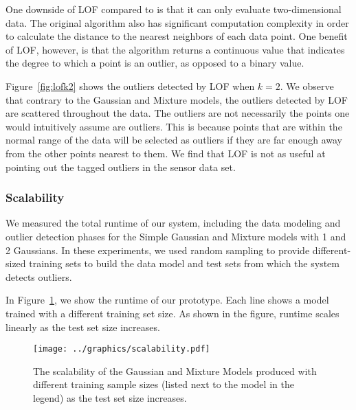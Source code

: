 One downside of LOF compared to \dBoost is that it can only evaluate two-dimensional data.
The original algorithm also has significant computation complexity in order to calculate the distance to the nearest neighbors of each data point.
One benefit of LOF, however, is that the algorithm returns a continuous value that indicates the degree to which a point is an outlier, as opposed to a binary value.

Figure~\ref{fig:lofk2} shows the outliers detected by LOF when $k=2$.
We observe that contrary to the Gaussian and Mixture models, the outliers detected by LOF are scattered throughout the data.
The outliers are not necessarily the points one would intuitively assume are outliers.
This is because points that are within the normal range of the data will be selected as outliers if they are far enough away from the other points nearest to them.
We find that LOF is not as useful at pointing out the tagged outliers in the sensor data set.

\subsubsection{Scalability}

We measured the total runtime of our system, including the data modeling and outlier detection phases for the Simple Gaussian and Mixture models with 1 and 2 Gaussians. In these experiments, we used random sampling to provide different-sized training sets to build the data model and test sets from which the system detects outliers.

In Figure~\ref{fig:scaling}, we show the runtime of our prototype. Each line shows a model trained with a different training set size. As shown in the figure, runtime scales linearly as the test set size increases.

\begin{figure}
\centering
\texttt{[image: ../graphics/scalability.pdf]}
\caption{The scalability of the Gaussian and Mixture Models produced with different training sample sizes (listed next to the model in the legend) as the test set size increases.}
\label{fig:scaling}
\end{figure}
